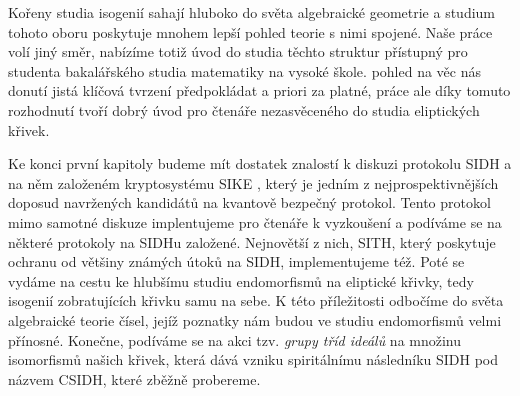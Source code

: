 \documentclass[12pt]{report}
\begin{document}
Kořeny studia isogenií sahají hluboko do světa algebraické geometrie a studium tohoto oboru poskytuje mnohem lepší pohled  teorie s nimi spojené. Naše práce volí jiný směr, nabízíme totiž úvod do studia těchto struktur přístupný pro studenta bakalářského studia matematiky na vysoké škole.   pohled na věc nás donutí jistá klíčová tvrzení předpokládat a priori za platné, práce ale díky tomuto rozhodnutí tvoří dobrý úvod pro čtenáře nezasvěceného do studia eliptických křivek.

Ke konci první kapitoly budeme mít dostatek znalostí k diskuzi protokolu SIDH a na něm založeném kryptosystému SIKE \cite{DeFeo3}, který je jedním z nejprospektivnějších doposud navržených kandidátů na kvantově bezpečný protokol. Tento protokol mimo samotné diskuze implentujeme pro čtenáře k vyzkoušení a podíváme se na některé protokoly na SIDHu založené. Nejnovětší z nich, SITH, který poskytuje ochranu od většiny známých útoků na SIDH, implementujeme též. Poté se vydáme na cestu ke hlubšímu studiu endomorfismů na eliptické křivky, tedy isogenií zobratujících křivku samu na sebe. K této příležitosti odbočíme do světa algebraické teorie čísel, jejíž poznatky nám budou ve studiu endomorfismů velmi přínosné. Konečne, podíváme se na akci tzv. \textit{grupy tříd ideálů} na množinu isomorfismů našich křivek, která dává vzniku spiritálnímu následníku SIDH pod názvem CSIDH, které zběžně probereme. 

 
\end{document}

